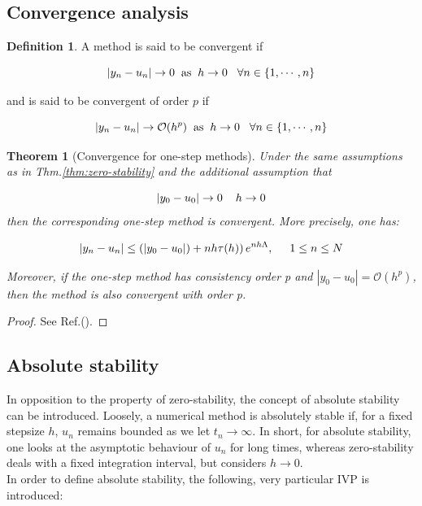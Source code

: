 \documentclass[11pt]{article}
\theoremstyle{theorem}
\newtheorem{theorem}{Theorem}
\theoremstyle{definition}
\newtheorem{definition}{Definition}
\begin{document}
\subsection{Convergence analysis}
\begin{definition}
	\label{def:convergence}
	A method is said to be convergent if 
	
	$$|y_n-u_n|\rightarrow 0\hspace{2mm}\text{as}\hspace{2mm}h\rightarrow 0\hspace{3mm}\forall n\in\lbrace 1,\cdots, n\rbrace$$
	
	and is said to be convergent of order $p$ if 
	
	
	$$|y_n-u_n|\rightarrow \mathcal{O}(h^p)\hspace{2mm}\text{as}\hspace{2mm}h\rightarrow 0\hspace{3mm}\forall n\in\lbrace 1,\cdots, n\rbrace$$
\end{definition}

\begin{theorem}[Convergence for one-step methods]
	\label{thm:convergence-one-step}
	Under the same assumptions as in Thm.\ref{thm:zero-stability} and the additional assumption that 
	
	$$|y_0-u_0|\rightarrow 0\hspace{4mm}h\rightarrow 0$$
    then the corresponding one-step method is convergent. More precisely, one has:
    
    \begin{align}
    	\label{eqn:convergence-one-step}
    	|y_n-u_n|\le\left(|y_0-u_0|)+nh\tau (h)\right)e^{nh\Lambda},\hspace{5mm}1\le n\le N
    \end{align}
    
    Moreover, if the one-step method has consistency order p and $|y_0-u_0|=\mathcal{O}(h^p)$, then the method is also convergent with order p.\\
\end{theorem}

\begin{proof}
	See Ref.(\cite{lec-notes}).
\end{proof}

\subsection{Absolute stability}
In opposition to the property of zero-stability, the concept of absolute stability can be introduced. Loosely, a numerical method is absolutely stable if, for a fixed stepsize
$h$, $u_n$ remains bounded as we let $t_n\rightarrow\infty$. In short, for absolute stability, one looks at the asymptotic behaviour of $u_n$ for long times, whereas zero-stability deals with a fixed integration interval, but considers $h\rightarrow 0$.\\
In order to define absolute stability, the following, very particular IVP is introduced: 
\end{document}

